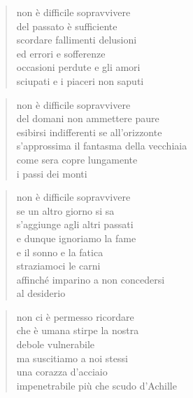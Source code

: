 \clearpage



	\begin{verse}
		non è difficile sopravvivere\\
		del passato è sufficiente\\
		scordare fallimenti delusioni\\
		ed errori e sofferenze\\
		occasioni perdute e gli amori\\
		sciupati e i piaceri non saputi
	\end{verse}

	\begin{verse}
		non è difficile sopravvivere\\
		del domani non ammettere paure\\
		esibirsi indifferenti se all’orizzonte\\
		s’approssima il fantasma della vecchiaia\\
		come sera copre lungamente\\
		i passi dei monti
	\end{verse}

	\begin{verse}
		non è difficile sopravvivere\\
		se un altro giorno si sa\\
		s’aggiunge agli altri passati\\
                e dunque ignoriamo la fame\\
                e il sonno e la fatica\\
                straziamoci le carni\\
                affinché imparino a non concedersi\\
                al desiderio
	\end{verse}

	\begin{verse}
                non ci è permesso ricordare\\
                che è umana stirpe la nostra\\
                debole vulnerabile\\
                ma suscitiamo a noi stessi\\
                una corazza d'acciaio\\
                impenetrabile più che scudo d'Achille
	\end{verse}

\clearpage

